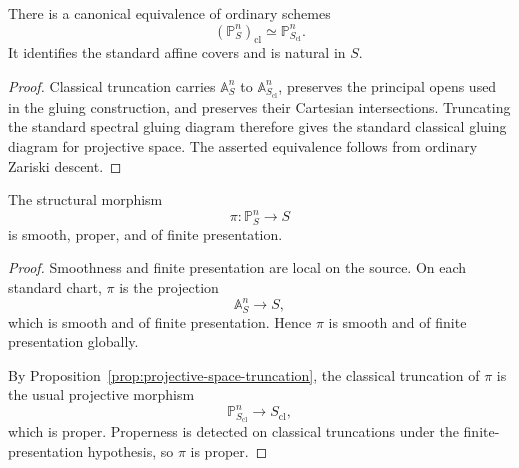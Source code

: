 \begin{proposition}
\label{prop:projective-space-truncation}
There is a canonical equivalence of ordinary schemes
\[
    (\mathbb P^n_S)_{\mathrm{cl}}
    \simeq
    \mathbb P^n_{S_{\mathrm{cl}}}.
\]
It identifies the standard affine covers and is natural in \(S\).
\end{proposition}

\begin{proof}
Classical truncation carries
\(\mathbb A^n_S\) to \(\mathbb A^n_{S_{\mathrm{cl}}}\), preserves the
principal opens used in the gluing construction, and preserves their
Cartesian intersections.  Truncating the standard spectral gluing diagram
therefore gives the standard classical gluing diagram for projective space.
The asserted equivalence follows from ordinary Zariski descent.
\end{proof}

\begin{proposition}
\label{prop:projective-space-smooth-proper}
The structural morphism
\[
    \pi:\mathbb P^n_S\longrightarrow S
\]
is smooth, proper, and of finite presentation.
\end{proposition}

\begin{proof}
Smoothness and finite presentation are local on the source.  On each standard
chart, \(\pi\) is the projection
\[
    \mathbb A^n_S\longrightarrow S,
\]
which is smooth and of finite presentation.  Hence \(\pi\) is smooth and of
finite presentation globally.

By Proposition~\ref{prop:projective-space-truncation}, the classical
truncation of \(\pi\) is the usual projective morphism
\[
    \mathbb P^n_{S_{\mathrm{cl}}}
    \longrightarrow
    S_{\mathrm{cl}},
\]
which is proper.  Properness is detected on classical truncations under the
finite-presentation hypothesis, so \(\pi\) is proper.
\end{proof}


